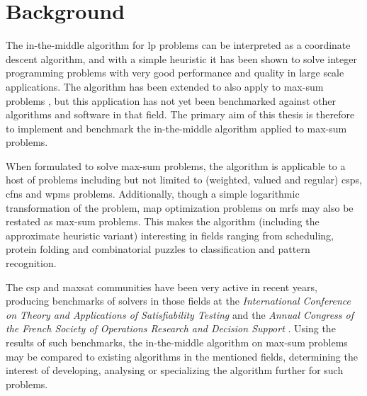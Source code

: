 \section{Background}
The in-the-middle algorithm \parencite{Wedelin95} for \gls{lp} problems can be interpreted as a coordinate descent algorithm, and with a simple heuristic it has been shown to solve integer programming problems with very good performance and quality in large scale applications.
The algorithm has been extended to also apply to max-sum problems \parencites{Wedelin08}{Wedelin13}, but this application has not yet been benchmarked against other algorithms and software in that field.
The primary aim of this thesis is therefore to implement and benchmark the in-the-middle algorithm applied to max-sum problems.

When formulated to solve max-sum problems, the algorithm is applicable to a host of problems including but not limited to (weighted, valued and regular) \glspl{csp}, \glspl{cfn} and \gls{wpms} problems.
Additionally, though a simple logarithmic transformation of the problem, \gls{map} optimization problems on \glspl{mrf} may also be restated as max-sum problems.
This makes the algorithm (including the approximate heuristic variant) interesting in fields ranging from scheduling, protein folding and combinatorial puzzles to classification and pattern recognition.

The \gls{csp} and \gls{maxsat} communities have been very active in recent years, producing benchmarks of solvers in those fields at the \emph{International Conference on Theory and Applications of Satisfiability Testing} \parencite{Argelich11} and the \emph{Annual Congress of the French Society of Operations Research and Decision Support} \parencite{Allouche14b}.
Using the results of such benchmarks, the in-the-middle algorithm on max-sum problems may be compared to existing algorithms in the mentioned fields, determining the interest of developing, analysing or specializing the algorithm further for such problems.
